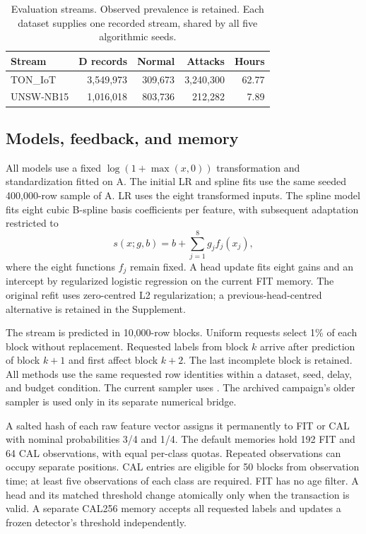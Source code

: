 \begin{table}[tb]
\centering\small
\caption{Evaluation streams. Observed prevalence is retained. Each dataset supplies one recorded stream, shared by all five algorithmic seeds.}
\label{tab:data}
\begin{tabular}{lrrrr}
\toprule
Stream & D records & Normal & Attacks & Hours \\
\midrule
TON\_IoT & 3,549,973 & 309,673 & 3,240,300 & 62.77 \\
UNSW-NB15 & 1,016,018 & 803,736 & 212,282 & 7.89 \\
\bottomrule
\end{tabular}
\end{table}

\subsection{Models, feedback, and memory}
All models use a fixed $\log(1+\max(x,0))$ transformation and standardization fitted on A. The initial LR and spline fits use the same seeded 400,000-row sample of A. LR uses the eight transformed inputs. The spline model fits eight cubic B-spline basis coefficients per feature, with subsequent adaptation restricted to
\begin{equation}
 s(x;g,b)=b+\sum_{j=1}^{8}g_j f_j(x_j),
\end{equation}
where the eight functions $f_j$ remain fixed. A head update fits eight gains and an intercept by regularized logistic regression on the current FIT memory. The original refit uses zero-centred L2 regularization; a previous-head-centred alternative is retained in the Supplement.

The stream is predicted in 10,000-row blocks. Uniform requests select 1\% of each block without replacement. Requested labels from block $k$ arrive after prediction of block $k+1$ and first affect block $k+2$. The last incomplete block is retained. All methods use the same requested row identities within a dataset, seed, delay, and budget condition. The current sampler uses . The archived campaign's older sampler is used only in its separate numerical bridge.

A salted hash of each raw feature vector assigns it permanently to FIT or CAL with nominal probabilities 3/4 and 1/4. The default memories hold 192 FIT and 64 CAL observations, with equal per-class quotas. Repeated observations can occupy separate positions. CAL entries are eligible for 50 blocks from observation time; at least five observations of each class are required. FIT has no age filter. A head and its matched threshold change atomically only when the transaction is valid. A separate CAL256 memory accepts all requested labels and updates a frozen detector's threshold independently.

